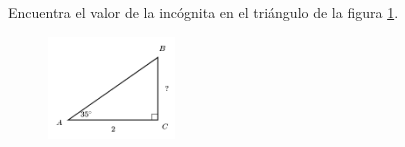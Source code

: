 \question[15]  Encuentra el valor de la incógnita en el triángulo de la figura \ref{fig:lados_functrig_23}.
\begin{figure}[H]
    \begin{center}
        \includegraphics[width=0.3\textwidth]{../images/lados_functrig_23.png}
    \end{center}
    \caption{}
    \label{fig:lados_functrig_23}
\end{figure}